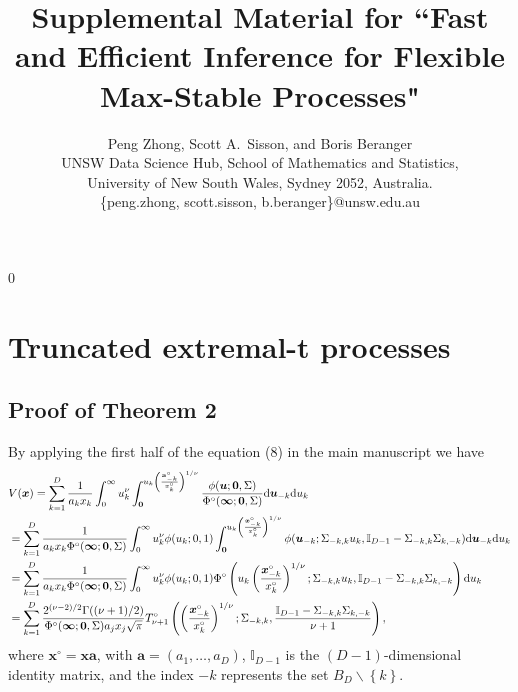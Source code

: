 \documentclass[12pt]{article}
\newcommand{\blind}{0}
\begin{document}
\def\spacingset#1{\renewcommand{\baselinestretch}%
{#1}\small\normalsize} \spacingset{1}

\title{\bf Supplemental Material for ``Fast and Efficient Inference for Flexible Max-Stable Processes"}
\blind
{
  \author{Peng Zhong, Scott A.~Sisson, and Boris Beranger \\ 
  UNSW Data Science Hub, School of Mathematics and Statistics,\\ University of New South Wales, Sydney 2052, Australia. \\
  \{peng.zhong, scott.sisson, b.beranger\}@unsw.edu.au}
  \maketitle
} \fi


\baselineskip=26pt

\appendix
\section{Truncated extremal-t processes}
\label{sec:appendix_truncated_extremal_t}
\subsection{Proof of Theorem 2}
By applying the first half of the equation (8) in the main manuscript %
we have 
\begin{align}
& V(\bm x) = \sum_{k=1}^D\frac{1}{a_kx_k}\int_0^\infty u_k^\nu \int_{\bm 0}^{u_k \left(\frac{\bm x_{-k}^\circ}{x_{k}^\circ}\right)^{1/\nu}} \frac{\phi(\bm u;\bm 0, \Sigma)}{\Phi^\circ(\bm \infty;\bm 0, \Sigma)}\text d \bm u_{-k}\text d u_k \nonumber \\ 
&=\sum_{k=1}^D\frac{1}{a_k x_k \Phi^\circ(\bm \infty;\bm 0, \Sigma)}\int_0^\infty u_k^\nu \phi(u_k;0, 1) \int_{\bm 0}^{u_k\left(\frac{\bm x_{-k}^\circ}{x_k^\circ}\right)^{1/\nu}}\phi(\bm u_{-k}; \Sigma_{-k,k}u_k, \mathbb{I}_{D-1}-\Sigma_{-k,k}\Sigma_{k,-k})\text d \bm u_{-k}\text d u_k \nonumber \\ 
&=\sum_{k=1}^D\frac{1}{a_kx_k \Phi^\circ(\bm \infty;\bm 0, \Sigma)}\int_0^\infty u_k^\nu \phi(u_k; 0, 1) \Phi^\circ\left(u_k\left(\frac{\bm x_{-k}^\circ}{x_k^\circ}\right)^{1/\nu};\Sigma_{-k,k}u_k,\mathbb{I}_{D-1} -\Sigma_{-k,k}\Sigma_{k,-k}\right)\text d u_k \nonumber \\  
&=\sum_{k=1}^D \frac{2^{(\nu-2)/2} \Gamma((\nu+1)/2)}{\Phi^\circ(\bm \infty;\bm 0, \Sigma) a_jx_j \sqrt{\pi}} T_{\nu+1}^\circ\left(\left(\frac{\bm x_{-k}^\circ}{x_k^\circ}\right)^{1/\nu};\Sigma_{-k,k},\frac{\mathbb{I}_{D-1}-\Sigma_{-k,k}\Sigma_{k,-k}}{\nu+1}\right)
\label{eq:truncated_extremal_t_V},
\end{align}
where $\bm x^\circ = \bm x \bm a$, with $\bm a = (a_1, \ldots, a_D)$, $\mathbb{I}_{D-1}$ is the $(D-1)$-dimensional identity matrix, and the index $-k$ represents the set $B_D \backslash \left\{ k\right\}$.
\end{document}
